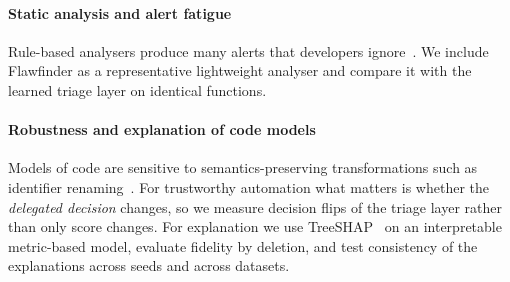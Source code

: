 \paragraph{Static analysis and alert fatigue}
Rule-based analysers produce many alerts that developers ignore~\cite{johnson2013why}. We include Flawfinder as a representative lightweight analyser and compare it with the learned triage layer on identical functions.

\paragraph{Robustness and explanation of code models}
Models of code are sensitive to semantics-preserving transformations such as identifier renaming~\cite{rabin2021generalizability,yefet2020adversarial}. For trustworthy automation what matters is whether the \emph{delegated decision} changes, so we measure decision flips of the triage layer rather than only score changes. For explanation we use TreeSHAP~\cite{lundberg2017shap,lundberg2020treeshap} on an interpretable metric-based model, evaluate fidelity by deletion, and test consistency of the explanations across seeds and across datasets.
